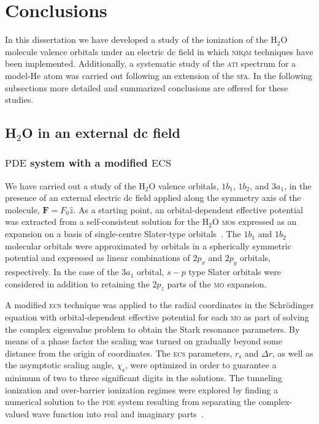 \chapter{Conclusions}
\label{ch:conclusions}

In this dissertation we have developed a study of the ionization of
the H$_{2}$O molecule valence orbitals under an electric dc field in
which \textsc{nhqm} techniques have been implemented. Additionally, a
systematic study of the \textsc{ati} spectrum for a model-He atom was
carried out following an extension of the \textsc{sfa}. In the
following subsections more detailed and summarized conclusions are
offered for these studies.

\section{H$_{2}$O in an external dc field}
\label{ch:h2o_results}

\subsection*{$\mathrm{PDE}$ system with a modified $\mathrm{ECS}$}



We have carried out a study of the H$_{2}$O valence orbitals,
$1b_{1}$, $1b_{2}$, and $3a_{1}$, in the presence of an external
electric dc field applied along the symmetry axis of the molecule,
$\mathbf{F} = F_{0}\hat{z}$. As a starting point, an orbital-dependent
effective potential was extracted from a self-consistent solution for
the H$_{2}$O \textsc{mo}s expressed as an expansion on a basis of
single-centre Slater-type orbitals~\cite{Moccia_1964}. The $1b_{1}$
and $1b_{2}$ molecular orbitals were approximated by orbitals in a
spherically symmetric potential and expressed as linear combinations
of $2p_{x}$ and $2p_{y}$ orbitals, respectively. In the case of the
$3a_{1}$ orbital, $s-p$ type Slater orbitals were considered in
addition to retaining the $2p_{z}$ parts of the \textsc{mo} expansion.

A modified \textsc{ecs} technique was applied to the radial
coordinates in the Schr\"{o}dinger equation with orbital-dependent
effective potential for each \textsc{mo} as part of solving the
complex eigenvalue problem to obtain the Stark resonance
parameters. By means of a phase factor the scaling was turned on
gradually beyond some distance from the origin of coordinates. The
\textsc{ecs} parameters, $r_{\mathrm{s}}$ and $\Delta r$, as well as
the asymptotic scaling angle, $\chi_{\mathrm{s}}$, were optimized in
order to guarantee a minimum of two to three significant digits in the
solutions. The tunneling ionization and over-barrier ionization
regimes were explored by finding a numerical solution to the
\textsc{pde} system resulting from separating the complex-valued wave
function into real and imaginary parts~\cite{sarias_2016,sarias_2017}.


